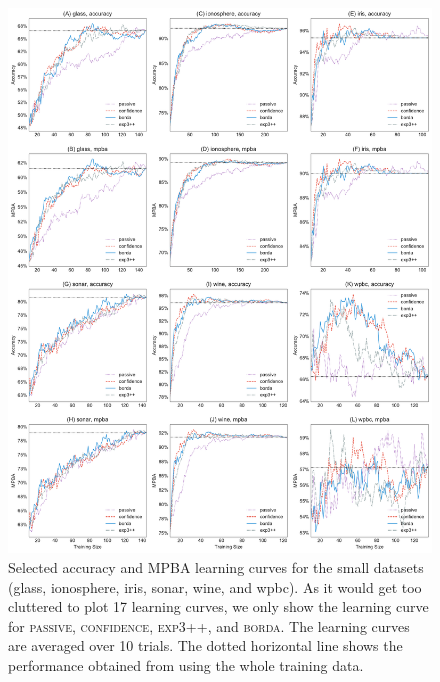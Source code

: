 \documentclass[fleqn,10pt,lineno]{wlpeerj} %
\begin{document}
\begin{figure}[tbp]
	\centering
	\includegraphics[width=\textwidth]{Fig8}
	\caption[Selected learning curves]{Selected accuracy and MPBA learning
	curves for the small datasets (glass, ionosphere, iris, sonar, wine, and
	wpbc). As it would get too cluttered to plot 17 learning curves, we only
	show the learning curve for \textsc{passive}, \textsc{confidence},
	\textsc{exp3++}, and \textsc{borda}. The learning curves are averaged over
	10 trials. The dotted horizontal line shows the performance obtained from
	using the whole training data.}
	\label{fig:learning_curves-small}
\end{figure}
\end{document}
